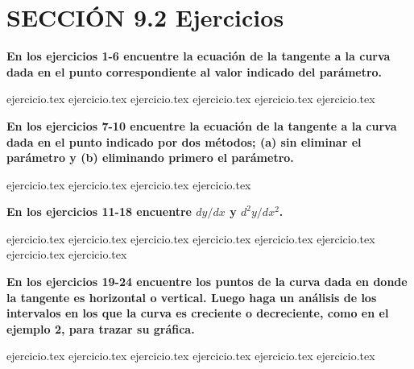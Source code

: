 
\section*{SECCIÓN 9.2 \quad Ejercicios}

\noindent\textbf{En los ejercicios 1-6 encuentre la ecuación de la tangente a la curva dada en el punto correspondiente al valor indicado del parámetro.}
\begin{enumerate}
    {ejercicio.tex}
{ejercicio.tex}
{ejercicio.tex}
{ejercicio.tex}
{ejercicio.tex}
{ejercicio.tex}
\end{enumerate}

\vspace{0.5cm}
\noindent\textbf{En los ejercicios 7-10 encuentre la ecuación de la tangente a la curva dada en el punto indicado por dos métodos; (a) sin eliminar el parámetro y (b) eliminando primero el parámetro.}
\begin{enumerate}
    \setcounter{enumi}{6}
    {ejercicio.tex}
{ejercicio.tex}
{ejercicio.tex}
{ejercicio.tex}
\end{enumerate}

\vspace{0.5cm}
\noindent\textbf{En los ejercicios 11-18 encuentre $dy/dx$ y $d^2y/dx^2$.}
\begin{enumerate}
    \setcounter{enumi}{10}
    {ejercicio.tex}
{ejercicio.tex}
{ejercicio.tex}
{ejercicio.tex}
{ejercicio.tex}
{ejercicio.tex}
{ejercicio.tex}
{ejercicio.tex}
\end{enumerate}

\vspace{0.5cm}
\noindent\textbf{En los ejercicios 19-24 encuentre los puntos de la curva dada en donde la tangente es horizontal o vertical. Luego haga un análisis de los intervalos en los que la curva es creciente o decreciente, como en el ejemplo 2, para trazar su gráfica.}
\begin{enumerate}
    \setcounter{enumi}{18}
    {ejercicio.tex}
{ejercicio.tex}
{ejercicio.tex}
{ejercicio.tex}
{ejercicio.tex}
{ejercicio.tex}
\end{enumerate}

